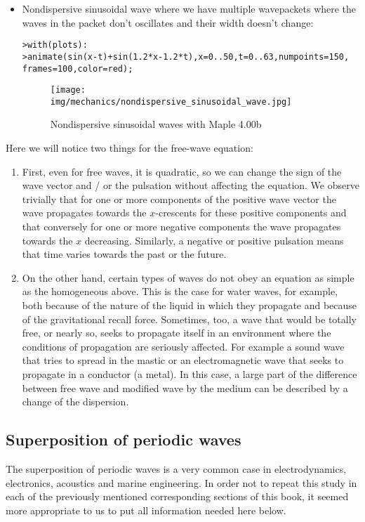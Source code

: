 \begin{itemize}
		\item Nondispersive sinusoidal wave where we have multiple wavepackets where the waves in the packet don't oscillates and their width doesn't change:
		
		\texttt{>with(plots): \\
				>animate(sin(x-t)+sin(1.2*x-1.2*t),x=0..50,t=0..63,numpoints=150,\\frames=100,color=red);}
		\begin{figure}[H]
			\centering
			\texttt{[image: img/mechanics/nondispersive\_sinusoidal\_wave.jpg]}
			\caption{Nondispersive sinusoidal waves with Maple 4.00b}
		\end{figure}
	\end{itemize} 
	Here we will notice two things for the free-wave equation:
	\begin{enumerate}
		\item First, even for free waves, it is quadratic, so we can change the sign of the wave vector and / or the pulsation without affecting the equation. We observe trivially that for one or more components of the positive wave vector the wave propagates towards the $x$-crescents for these positive components and that conversely for one or more negative components the wave propagates towards the $x$ decreasing. Similarly, a negative or positive pulsation means that time varies towards the past or the future.
	
		\item On the other hand, certain types of waves do not obey an equation as simple as the homogeneous above. This is the case for water waves, for example, both because of the nature of the liquid in which they propagate and because of the gravitational recall force. Sometimes, too, a wave that would be totally free, or nearly so, seeks to propagate itself in an environment where the conditions of propagation are seriously affected. For example a sound wave that tries to spread in the mastic or an electromagnetic wave that seeks to propagate in a conductor (a metal). In this case, a large part of the difference between free wave and modified wave by the medium can be described by a change of the dispersion.
	\end{enumerate}
	
	\pagebreak
	\subsection{Superposition of periodic waves}
	The superposition of periodic waves is a very common case in electrodynamics, electronics, acoustics and marine engineering. In order not to repeat this study in each of the previously mentioned corresponding sections of this book, it seemed more appropriate to us to put all information needed here below.
	
